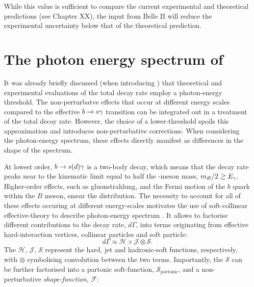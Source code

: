 While this value is sufficient to compare the current experimental and theoretical predictions (see Chapter XX), the input from Belle II will reduce the experimental uncertainty below that of the theoretical prediction.

\section{The photon energy spectrum of \texorpdfstring{\BtoXsdgamma}{B->Xsg}}\label{sec:btosgamma_spectrum_theory}

It was already briefly discussed (when introducing ) that theoretical and experimental evaluations of the total \BtoXsgamma decay rate employ a photon-energy threshold.
The non-perturbatve effects that occur at different energy scales compared to the effective $b\rightarrow s\gamma$ transition can be integrated out in a treatment of the total decay rate.
However, the choice of a lower-threshold spoils this approximation and introduces non-perturbative corrections.
When considering the photon-energy spectrum, these effects directly manifest as differences in the shape of the spectrum.

At lowest order, $b\rightarrow s(d) \gamma$ is a two-body decay, which means that the decay rate peaks near to the kinematic limit equal to half the \B-meson mass, $m_B/2\gsim E_{\g}$.
Higher-order effects, such as gluonstrahlung, and the Fermi motion of the $b$ quark within the $B$ meson, smear the distribution.
The necessity to account for all of these effects occuring at different energy-scales motivates the use of soft-collinear effective-theory to describe \BtoXsgamma photon-energy spectrum \cite{Neubert:2004qw,Ligeti:2008ac}.
It allows to factorise different contributions to the decay rate, $d\Gamma$, into terms originating from effective hard-interaction vertices, collinear particles and soft particle:
\begin{equation}\label{eq:differential_decay_rate_SCET}
    d\Gamma \propto \mathcal{H} \times \mathcal{J} \otimes \mathcal{S}.
\end{equation}
The $\mathcal{H}$, $\mathcal{J}$, $\mathcal{S}$ represent the hard, jet and hadronic-soft functions, respectively, with $\otimes$ symbolising convolution between the two terms.
Importantly, the $\mathcal{S}$ can be further factorised into a partonic soft-function, $\mathcal{S}_{\mathrm{partonic}}$, and a non-perturbative \textit{shape-function}, $\mathcal{F}$:

